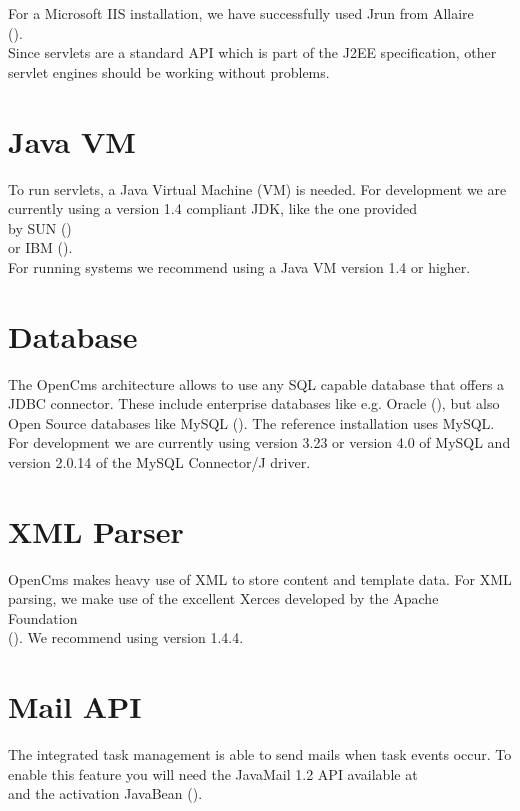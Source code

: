 For a Microsoft IIS installation, we have successfully used Jrun from Allaire \\
().\\
Since servlets are a standard API which is part of the J2EE specification,
other servlet engines should be working without problems.

\section{Java VM}
To run servlets, a Java Virtual Machine (VM) is needed. For development we are currently using
a version 1.4 compliant JDK, like the one provided \\
by SUN ()\\
or IBM ().\\
For running systems we recommend using a Java VM version 1.4 or higher.

\section{Database}
The OpenCms architecture allows to use any SQL capable database that offers a JDBC connector.
These include enterprise databases like e.g. Oracle (),
but also Open Source databases like MySQL ().
The reference installation uses MySQL. For development we are currently using version 3.23 or version 4.0 of 
MySQL and version 2.0.14 of the MySQL Connector/J driver.

\section{XML Parser}
OpenCms makes heavy use of XML to store content and template data. For XML parsing, we make use of
the excellent Xerces developed by the Apache Foundation\\
().
We recommend using version 1.4.4.

\section{Mail API}
The integrated task management is able to send mails when task events occur.
To enable this feature you will need the JavaMail 1.2 API available at \\
 and the activation Java\-Bean
().

